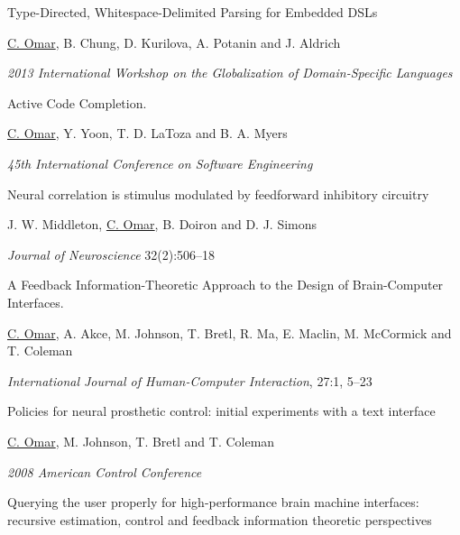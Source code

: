 \documentclass[10pt,letterpaper]{article}
\renewenvironment{itemize}{
  \begin{list}{}{
    \setlength{\leftmargin}{1.25em}
    \setlength{\itemsep}{0.25em}
    \setlength{\parskip}{0pt}
    \setlength{\parsep}{0.2em}
  }
}{
  \end{list}
}
\begin{document}
\begin{enumerate}[leftmargin=*, labelindent=6.5em, font=\bfseries]
\begin{itemize}
        \end{itemize}
  \item[GlobalDSL 2013] Type-Directed, Whitespace-Delimited Parsing for Embedded DSLs
        \begin{itemize}
          \item \underline{C. Omar}, B. Chung, D. Kurilova, A. Potanin and J. Aldrich
          \item \textit{2013 International Workshop on the Globalization of Domain-Specific Languages}
        \end{itemize}
  \item[ICSE 2012] {Active Code Completion}.
        \begin{itemize}
          \item \underline{C. Omar}, Y. Yoon, T. D. LaToza and B. A. Myers
          \item \textit{45th International Conference on Software Engineering}
        \end{itemize}
  \item[J. Neuro. 2012] {Neural correlation is stimulus modulated by feedforward inhibitory circuitry}
        \begin{itemize}
          \item J. W. Middleton, \underline{C. Omar}, B. Doiron and D. J. Simons
          \item \textit{Journal of Neuroscience} 32(2):506--18
        \end{itemize}
  \item[IJHCI 2011] A Feedback Information-Theoretic Approach to the Design of Brain-Computer Interfaces.
        \begin{itemize}
          \item  \underline{C. Omar}, A. Akce, M. Johnson, T. Bretl, R. Ma, E. Maclin, M. McCormick and T. Coleman
          \item \textit{International Journal of Human-Computer Interaction}, 27:1, 5--23
        \end{itemize}
  \item[ACC 2008] Policies for neural prosthetic control: initial experiments with a text interface
        \begin{itemize}
          \item \underline{C. Omar}, M. Johnson, T. Bretl and T. Coleman
          \item \textit{2008 American Control Conference} 
        \end{itemize}
  \item[ICASSP 2008] Querying the user properly for high-performance brain machine interfaces: recursive estimation, control and feedback information theoretic perspectives

\end{enumerate}
\end{document}
